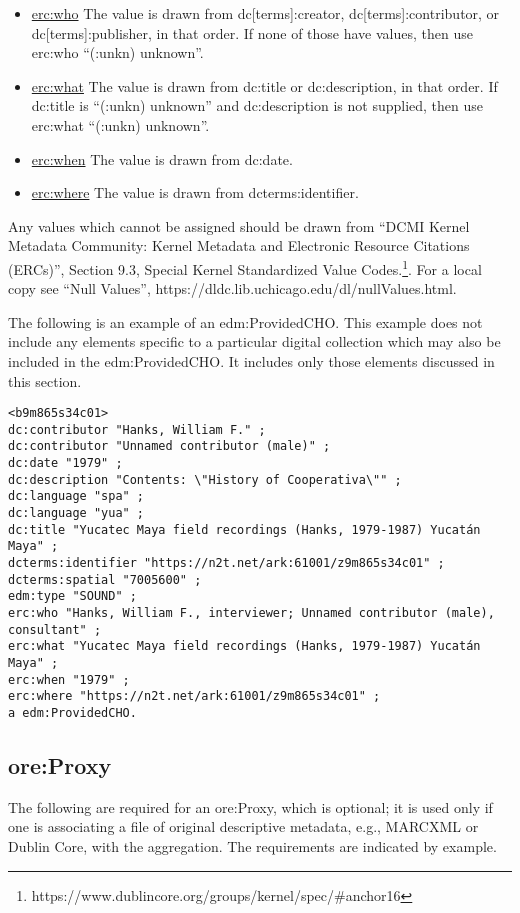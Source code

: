 \documentclass[11pt]{article}
\begin{document}
\begin{itemize}
\item \underline{erc:who} The value is drawn from dc[terms]:creator, dc[terms]:contributor, or dc[terms]:publisher, in that order. If none of those have values, then use erc:who ``(:unkn) unknown''.
\item \underline{erc:what} The value is drawn from dc:title or dc:description, in that order. If dc:title is ``(:unkn) unknown'' and dc:description is not supplied, then use erc:what ``(:unkn) unknown''.
\item \underline{erc:when} The value is drawn from dc:date.
\item \underline{erc:where} The value is drawn from dcterms:identifier.
\end{itemize}

Any values which cannot be assigned should be drawn from ``DCMI Kernel Metadata Community: Kernel Metadata and Electronic Resource Citations (ERCs)'', Section 9.3, Special Kernel Standardized Value Codes.\footnote{https://www.dublincore.org/groups/kernel/spec/\#anchor16}. For a local copy see ``Null Values'', https://dldc.lib.uchicago.edu/dl/nullValues.html.

The following is an example of an edm:ProvidedCHO. This example does not include any elements specific to a particular digital collection which may also be included in the edm:ProvidedCHO. It includes only those elements discussed in this section.

\begin{verbatim}
<b9m865s34c01>
dc:contributor "Hanks, William F." ;
dc:contributor "Unnamed contributor (male)" ;
dc:date "1979" ;
dc:description "Contents: \"History of Cooperativa\"" ;
dc:language "spa" ;
dc:language "yua" ;
dc:title "Yucatec Maya field recordings (Hanks, 1979-1987) Yucatán Maya" ;
dcterms:identifier "https://n2t.net/ark:61001/z9m865s34c01" ;
dcterms:spatial "7005600" ;
edm:type "SOUND" ;
erc:who "Hanks, William F., interviewer; Unnamed contributor (male), consultant" ;
erc:what "Yucatec Maya field recordings (Hanks, 1979-1987) Yucatán Maya" ;
erc:when "1979" ;
erc:where "https://n2t.net/ark:61001/z9m865s34c01" ;
a edm:ProvidedCHO.
\end{verbatim}

\subsection{ore:Proxy}

The following are required for an ore:Proxy, which is optional; it is used only if one is associating a file of original descriptive metadata, e.g., MARCXML or Dublin Core, with the aggregation. The requirements are indicated by example. 
\end{document}
